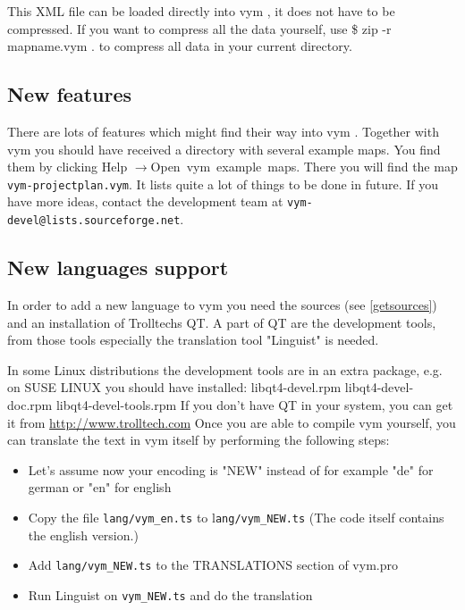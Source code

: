 \documentclass[12pt,a4paper]{article}
\newcommand{\vym}{{\sc vym }}
\newcommand{\ra}{$\longrightarrow$}
\newenvironment{code}[1] { \verbatim #1}{\endverbatim  }
\begin{document}
\begin{appendix}
This XML file can be loaded directly into \vym, it does not have to be
compressed. If you want to compress all the data yourself, use
\begin{code}
\$ zip -r mapname.vym .
\end{code}
to compress all data in your current directory.

\subsection{New features}
There are lots of features which might find their way into \vym.
Together with \vym you should have received a directory with several
example maps. You find them by clicking Help \ra Open~vym~example~maps.
There you will find the map {\tt vym-projectplan.vym}. It lists quite a
lot of things to be done in future. If you have more ideas, contact the
development team at {\tt vym-devel@lists.sourceforge.net}.


\subsection{New languages support}
In order to add a new language to \vym you need 
the sources (see \ref{getsources}) and
an installation of Trolltechs QT. A part of QT are the development
tools, from those tools especially the translation tool "Linguist" is
needed. 

In some Linux distributions the development tools are in an extra package, e.g. on SUSE LINUX you should have installed:
\begin{code}
libqt4-devel.rpm
libqt4-devel-doc.rpm
libqt4-devel-tools.rpm
\end{code}
If you don't have QT in your system, you can get it from 
	\href{http://www.trolltech.com}{http://www.trolltech.com} Once you
	are able to compile vym yourself, you can translate the text in vym
	itself by performing the following steps:
\begin{itemize}
	\item Let's assume now your encoding is "NEW" instead of for example
	"de" for german or "en" for english
	
	\item Copy the file {\tt lang/vym\_en.ts} to l{\tt ang/vym\_NEW.ts} (The code
	itself contains the english version.)
		
	\item Add {\tt lang/vym\_NEW.ts} to the TRANSLATIONS section of vym.pro

	\item Run Linguist on {\tt vym\_NEW.ts} and do the translation


\end{itemize}
\end{appendix}
\end{document}
